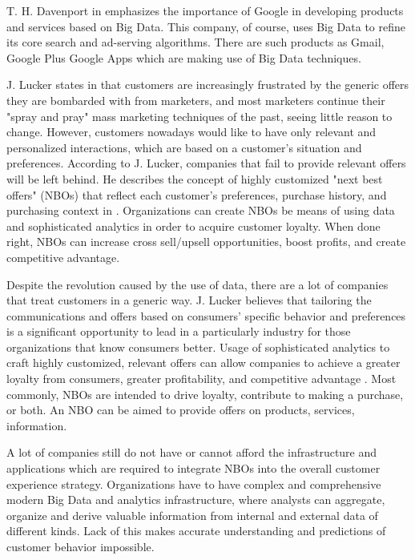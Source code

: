 \documentclass[runningheads]{llncs}
\begin{document}
\begin{enumerate}
T. H. Davenport in \cite{DAVENPORT} emphasizes the importance of Google in developing products and services based on Big Data. This company, of course, uses Big Data to refine its core search and ad-serving algorithms. There are such products as Gmail, Google Plus Google Apps which are making use of Big Data techniques. 

J. Lucker states in \cite{HBR} that customers are increasingly frustrated by the generic offers they are bombarded with from marketers, and most marketers continue their "spray and pray" mass marketing techniques of the past, seeing little reason to change. However, customers nowadays would like to have only relevant and personalized interactions, which are based on a customer's situation and preferences. According to J. Lucker, companies that fail to provide relevant offers will be left behind. He describes the concept of highly customized "next best offers" (NBOs) that reflect each customer's preferences, purchase history, and purchasing context in \cite{HBR}. Organizations can create NBOs be means of using data and sophisticated analytics in order to acquire customer loyalty. When done right, NBOs can increase cross sell/upsell opportunities, boost profits, and create competitive advantage.

Despite the revolution caused by the use of data, there are a lot of companies that treat customers in a generic way. J. Lucker believes that tailoring the communications and offers based on consumers' specific behavior and preferences is a significant opportunity to lead in a particularly industry for those organizations that know consumers better. Usage of sophisticated analytics to craft highly customized, relevant offers can allow companies to achieve a greater loyalty from consumers, greater profitability, and competitive advantage \cite{HBR}. Most commonly, NBOs are intended to drive loyalty, contribute to making a purchase, or both. An NBO can be aimed to provide offers on products, services, information.

A lot of companies still do not have or cannot afford the infrastructure and applications which are required to integrate NBOs into the overall customer experience strategy. Organizations have to have complex and comprehensive modern Big Data and analytics infrastructure, where analysts can aggregate, organize and derive valuable information from internal and external data of different kinds. Lack of this makes accurate understanding and predictions of customer behavior impossible.\\


\end{enumerate}
\end{document}

